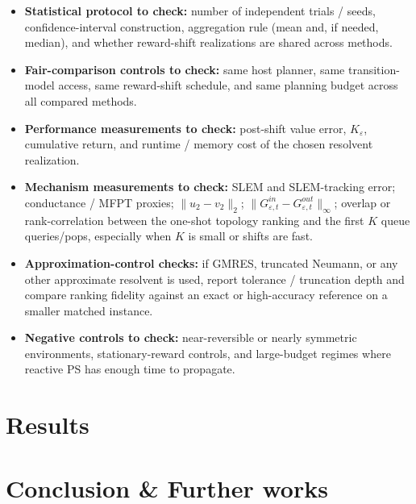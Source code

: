 \documentclass[10pt,a4paper]{article}
\begin{document}
\begin{itemize}
  \item \textbf{Statistical protocol to check:} number of independent trials / seeds, confidence-interval construction, aggregation rule (mean and, if needed, median), and whether reward-shift realizations are shared across methods.

  \item \textbf{Fair-comparison controls to check:} same host planner, same transition-model access, same reward-shift schedule, and same planning budget across all compared methods.

  \item \textbf{Performance measurements to check:} post-shift value error, $K_{\varepsilon}$, cumulative return, and runtime / memory cost of the chosen resolvent realization.

  \item \textbf{Mechanism measurements to check:} SLEM and SLEM-tracking error; conductance / MFPT proxies; $\|u_2-v_2\|_2$; $\|G^{in}_{\varepsilon,t}-G^{out}_{\varepsilon,t}\|_\infty$; overlap or rank-correlation between the one-shot topology ranking and the first $K$ queue queries/pops, especially when $K$ is small or shifts are fast.

  \item \textbf{Approximation-control checks:} if GMRES, truncated Neumann, or any other approximate resolvent is used, report tolerance / truncation depth and compare ranking fidelity against an exact or high-accuracy reference on a smaller matched instance.

  \item \textbf{Negative controls to check:} near-reversible or nearly symmetric environments, stationary-reward controls, and large-budget regimes where reactive PS has enough time to propagate.
\end{itemize}




\section{Results}




\section{Conclusion \& Further works}



\end{document}
